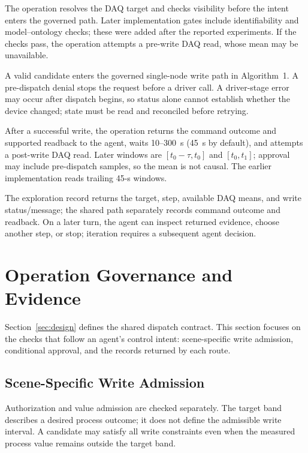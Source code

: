 \documentclass[journal]{IEEEtran}
\begin{document}
The operation resolves the DAQ target and checks visibility before the intent enters the governed path. Later implementation gates include identifiability and model--ontology checks; these were added after the reported experiments. If the checks pass, the operation attempts a pre-write DAQ read, whose mean may be unavailable.

A valid candidate enters the governed single-node write path in Algorithm~1. A pre-dispatch denial stops the request before a driver call. A driver-stage error may occur after dispatch begins, so status alone cannot establish whether the device changed; state must be read and reconciled before retrying.

After a successful write, the operation returns the command outcome and supported readback to the agent, waits 10--300~s (45~s by default), and attempts a post-write DAQ read. Later windows are $[t_0-\tau,t_0]$ and $[t_0,t_1]$; approval may include pre-dispatch samples, so the mean is not causal. The earlier implementation reads trailing 45-s windows.

The exploration record returns the target, step, available DAQ means, and write status/message; the shared path separately records command outcome and readback. On a later turn, the agent can inspect returned evidence, choose another step, or stop; iteration requires a subsequent agent decision.


 \section{Operation Governance and Evidence}
\label{sec:modules}
Section~\ref{sec:design} defines the shared dispatch contract. This section
focuses on the checks that follow an agent's control intent: scene-specific write admission,
conditional approval, and the records returned by each route.

\subsection{Scene-Specific Write Admission}
\label{sec:governed}
Authorization and value admission are checked separately. The target band describes a desired
process outcome; it does not define the admissible write interval. A candidate may
satisfy all write constraints even when the measured process value remains outside
the target band.
\end{document}
